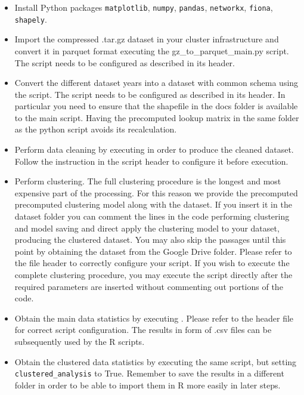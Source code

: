 \documentclass{acm_proc_article-sp-sigmod09}
\begin{document}
\begin{itemize}
	\item Install Python packages \texttt{matplotlib}, \texttt{numpy}, \texttt{pandas}, \texttt{networkx}, \texttt{fiona}, \texttt{shapely}.
	\item Import the compressed .tar.gz dataset in your cluster infrastructure and convert it in parquet format executing the gz\_to\_parquet\_main.py script. The script needs to be configured as described in its header.
	\item Convert the different dataset years into a dataset with common schema using the  script. The script needs to be configured as described in its header. In particular you need to ensure that the shapefile in the docs folder is available to the main script. Having the  precomputed lookup matrix in the same folder as the python script avoids its recalculation.
	\item Perform data cleaning by executing  in order to produce the cleaned dataset. Follow the instruction in the script header to configure it before execution.
	\item Perform clustering. The full clustering procedure is the longest and most expensive part of the processing. For this reason we provide the precomputed  precomputed clustering model along with the dataset. If you insert it in the dataset folder you can comment the lines in the code performing clustering and model saving and direct apply the clustering model to your dataset, producing the clustered dataset. You may also skip the passages until this point by obtaining the  dataset from the Google Drive folder. Please refer to the file header to correctly configure your script. If you wish to execute the complete clustering procedure, you may execute the script directly after the required parameters are inserted without commenting out portions of the code.
	\item Obtain the main data statistics by executing . Please refer to the header file for correct script configuration. The results in form of .csv files can be subsequently used by the R scripts.
	\item Obtain the clustered data statistics by executing the same script, but setting \texttt{clustered\_analysis} to True. Remember to save the results in a different folder in order to be able to import them in R more easily in later steps.

\end{itemize}
\end{document}
